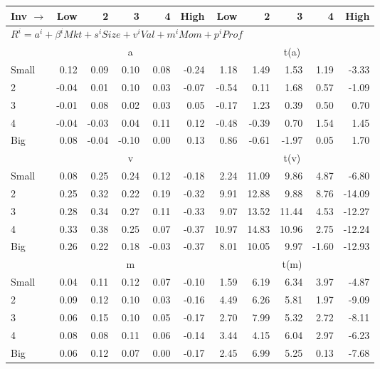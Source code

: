 

\begin{tabular}{lrrrrrrrrrr}
  \toprule
    
    Inv $\rightarrow$ & Low & 2 & 3 & 4 & High & Low & 2 & 3 & 4 & High  \\ 
  \midrule
  \multicolumn{11}{l}{$R^i=a^i+\beta^iMkt+s^iSize+v^iVal+m^iMom+p^iProf$}  \\
  
     & \multicolumn{5}{c}{a} & \multicolumn{5}{c}{t(a)}   \\
     \cmidrule(r){2-6} \cmidrule(r){7-11} 
    Small  & 0.12  & 0.09  & 0.10  & 0.08  & -0.24  & 1.18  & 1.49  & 1.53  & 1.19  & -3.33   \\
    2  & -0.04  & 0.01  & 0.10  & 0.03  & -0.07  & -0.54  & 0.11  & 1.68  & 0.57  & -1.09   \\
    3  & -0.01  & 0.08  & 0.02  & 0.03  & 0.05  & -0.17  & 1.23  & 0.39  & 0.50  & 0.70   \\
    4  & -0.04  & -0.03  & 0.04  & 0.11  & 0.12  & -0.48  & -0.39  & 0.70  & 1.54  & 1.45   \\
    Big  & 0.08  & -0.04  & -0.10  & 0.00  & 0.13  & 0.86  & -0.61  & -1.97  & 0.05  & 1.70   \\
    
  
     & \multicolumn{5}{c}{v} & \multicolumn{5}{c}{t(v)}   \\
     \cmidrule(r){2-6} \cmidrule(r){7-11} 
    Small  & 0.08  & 0.25  & 0.24  & 0.12  & -0.18  & 2.24  & 11.09  & 9.86  & 4.87  & -6.80   \\
    2  & 0.25  & 0.32  & 0.22  & 0.19  & -0.32  & 9.91  & 12.88  & 9.88  & 8.76  & -14.09   \\
    3  & 0.28  & 0.34  & 0.27  & 0.11  & -0.33  & 9.07  & 13.52  & 11.44  & 4.53  & -12.27   \\
    4  & 0.33  & 0.38  & 0.25  & 0.07  & -0.37  & 10.97  & 14.83  & 10.96  & 2.75  & -12.24   \\
    Big  & 0.26  & 0.22  & 0.18  & -0.03  & -0.37  & 8.01  & 10.05  & 9.97  & -1.60  & -12.93   \\
    
  
     & \multicolumn{5}{c}{m} & \multicolumn{5}{c}{t(m)}   \\
     \cmidrule(r){2-6} \cmidrule(r){7-11} 
    Small  & 0.04  & 0.11  & 0.12  & 0.07  & -0.10  & 1.59  & 6.19  & 6.34  & 3.97  & -4.87   \\
    2  & 0.09  & 0.12  & 0.10  & 0.03  & -0.16  & 4.49  & 6.26  & 5.81  & 1.97  & -9.09   \\
    3  & 0.06  & 0.15  & 0.10  & 0.05  & -0.17  & 2.70  & 7.99  & 5.32  & 2.72  & -8.11   \\
    4  & 0.08  & 0.08  & 0.11  & 0.06  & -0.14  & 3.44  & 4.15  & 6.04  & 2.97  & -6.23   \\
    Big  & 0.06  & 0.12  & 0.07  & 0.00  & -0.17  & 2.45  & 6.99  & 5.25  & 0.13  & -7.68   \\


\end{tabular}
